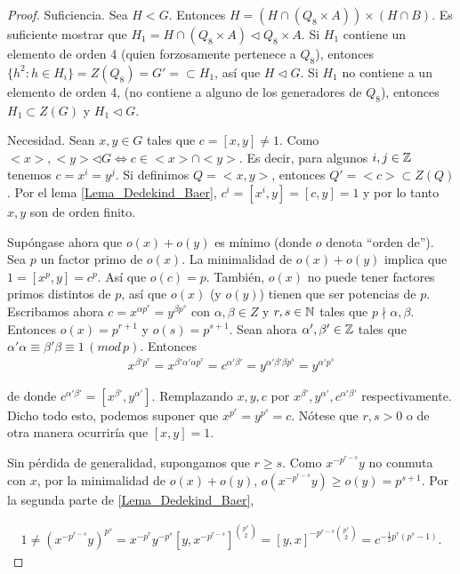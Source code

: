 \begin{proof}
    Suficiencia. Sea $H < G$. Entonces $H = (H \cap (Q_8 \times A)) \times (H \cap B)$.
    Es suficiente mostrar que $H_1 = H \cap (Q_8 \times A) \triangleleft Q_8 \times A$. Si $H_1$
    contiene un elemento de orden 4 (quien forzosamente pertenece a $Q_8$), entonces 
    $\{ h^2 : h \in H_i\} = Z(Q_8) = G' = \subset H_1$, así que $H \triangleleft G$. Si
    $H_1$ no contiene a un elemento de orden 4, (no contiene a alguno de los generadores de $Q_8$),
    entonces $H_1 \subset Z(G)$ y $H_1 \triangleleft G$.\pn
    
    Necesidad. 
    Sean $x,y \in G$ tales que $c = [x,y] \neq 1$. Como 
    $<x>, <y> \triangleleft G \Leftrightarrow c \in <x> \cap <y>$. Es decir, para algunos $i,j \in \mathbb{Z}$
    tenemos $c = x^i = y^j$. Si definimos $Q = <x,y>$, entonces $Q' = <c> \subset Z(Q)$. Por el lema
    \ref{Lema_Dedekind_Baer}, $c^i = [x^i, y] = [c, y] = 1$ y por lo tanto $x,y$ son de orden finito.\pn

    Supóngase ahora que $o(x) + o(y)$ es mínimo (donde $o$ denota ``orden de''). Sea $p$ un factor primo de $o(x)$.
    La minimalidad de $o(x) + o(y)$ implica que $1 = [x^p, y] = c^p$. Así que $o(c) = p$. También, $o(x)$ no
    puede tener factores primos distintos de $p$, así que $o(x)$ (y $o(y)$) tienen que ser potencias de $p$.
    Escribamos ahora $c = x^{\alpha p^r} = y^{\beta p^s}$ con $\alpha, \beta \in Z$ y $r,s \in \mathbb{N}$ tales que
    $p \nmid \alpha, \beta$. Entonces $o(x) = p^{r+1}$ y $o(s) = p^{s+1}$. Sean ahora $\alpha', \beta' \in \mathbb{Z}$
    tales que $\alpha' \alpha \equiv \beta' \beta \equiv 1 \,(mod\, p)$. Entonces
    \begin{align}
                x^{\beta' p^r} = x^{\beta' \alpha' \alpha p^r} = c^{\alpha' \beta'} = y^{\alpha' \beta' \beta p^s} = y^{\alpha' p^s}
    \end{align}\pn
    
    de donde $c^{\alpha' \beta'} = [x^{\beta'}, y^{\alpha'}]$. Remplazando $x,y,c$ por $x^{\beta'},y^{\alpha'},c^{\alpha' \beta'}$
    respectivamente. Dicho todo esto, podemos suponer que $x^{p^r} = y^{p^s} = c$. Nótese que $r, s > 0$ o de otra manera ocurriría que
    $[x,y] = 1$.\pn

    Sin pérdida de generalidad, supongamos que $r \geq s$. Como $x^{- p^{r-s}} y$ no conmuta con $x$, por la minimalidad
    de $o(x) + o(y)$, $o(x^{- p^{r-s}} y) \geq o(y) = p^{s+1}$. Por la segunda parte de \ref{Lema_Dedekind_Baer},
    
    \begin{align}
            1 \neq (x^{- p^{r-s}} y)^{p^s} = x^{- p^{r}} y^{- p^{s}} [y, x^{- p^{r-s}}]^{\binom{p^s}{2}} = 
            [y, x]^{-p^{r-s} \binom{p^s}{2}} =   c^{-\frac{1}{2} p^r (p^s - 1)}.
    \end{align}
    

\end{proof}
